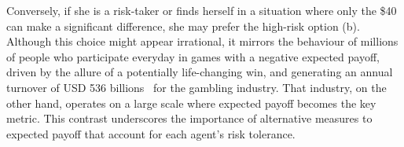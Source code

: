 Conversely, if she is a risk-taker or finds herself in a situation where only the \$40 can make a significant difference, she may prefer the high-risk option (b).
Although this choice might appear irrational, it mirrors the behaviour of millions of people who participate everyday in games with a negative expected payoff, driven by the allure of a potentially life-changing win, and generating an annual turnover of USD 536 billions~\cite{GamblingNewspaper23} for the gambling industry.
That industry, on the other hand, operates on a large scale where expected payoff becomes the key metric. 
This contrast underscores the importance of alternative measures to expected payoff that account for each agent's risk tolerance.%




